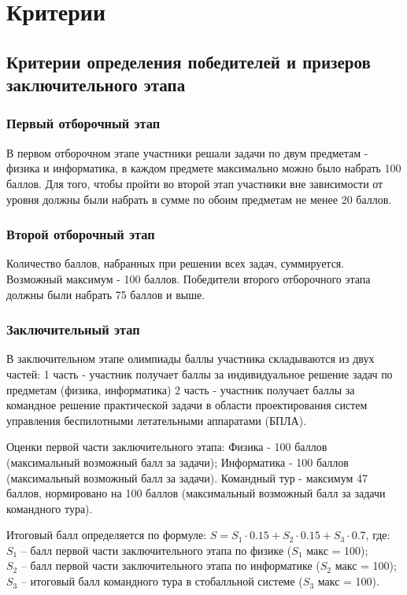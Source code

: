 \part{Критерии}

\chapter{Критерии определения победителей и призеров заключительного этапа}
\section{Первый отборочный этап}

В первом отборочном этапе участники решали задачи по двум предметам - физика и информатика, в каждом предмете максимально можно было набрать 100 баллов. Для того, чтобы пройти во второй этап участники вне зависимости от уровня должны были набрать в сумме по обоим предметам не менее 20 баллов.

\section{Второй отборочный этап}

Количество баллов, набранных при решении всех задач, суммируется. Возможный максимум - 100 баллов. 
Победители второго отборочного этапа должны были набрать 75 баллов и выше.

\section{Заключительный этап}

В заключительном этапе олимпиады баллы участника складываются из двух частей: 1 часть - участник получает баллы за индивидуальное решение задач по предметам (физика, информатика)
2 часть - участник получает баллы за командное решение практической задачи в области проектирования систем управления беспилотными летательными аппаратами (БПЛА).

Оценки первой части заключительного этапа:
Физика - 100 баллов (максимальный возможный балл за задачи);
Информатика - 100 баллов (максимальный возможный балл за задачи).
Командный тур  - максимум 47 баллов, нормировано на 100 баллов (максимальный возможный балл за задачи командного тура).

Итоговый балл определяется по формуле: $S = S_1 \cdot 0.15 + S_2 \cdot 0.15 + S_3 \cdot 0.$7, где:\\
$S_1$ – балл первой части заключительного этапа по физике ($S_1$ макс = 100);\\
$S_2$ – балл первой части заключительного этапа по информатике ($S_2$ макс = 100);\\
$S_3$ – итоговый балл командного тура в стобалльной системе ($S_3$ макс = 100).

